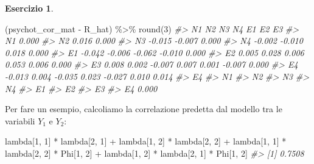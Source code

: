 \documentclass[
  11pt,
]{krantz}
\makeatletter
\newenvironment{Shaded}{\begin{snugshade}}{\end{snugshade}}
\newcommand{\CommentTok}[1]{\textcolor[rgb]{0.37,0.37,0.37}{\textit{#1}}}
\newcommand{\DecValTok}[1]{\textcolor[rgb]{0.06,0.06,0.06}{#1}}
\newcommand{\FunctionTok}[1]{\textcolor[rgb]{0,0,0}{#1}}
\newcommand{\NormalTok}[1]{#1}
\newcommand{\SpecialCharTok}[1]{\textcolor[rgb]{0,0,0}{#1}}
\newenvironment{kframe}{%
\medskip{}
\setlength{\fboxsep}{.8em}
 \def\at@end@of@kframe{}%
 \ifinner\ifhmode%
  \def\at@end@of@kframe{\end{minipage}}%
  \begin{minipage}{\columnwidth}%
 \fi\fi%
 \def\FrameCommand##1{\hskip\@totalleftmargin \hskip-\fboxsep
 \colorbox{shadecolor}{##1}\hskip-\fboxsep
     \hskip-\linewidth \hskip-\@totalleftmargin \hskip\columnwidth}%
 \MakeFramed {\advance\hsize-\width
   \@totalleftmargin\z@ \linewidth\hsize
   \@setminipage}}%
 {\par\unskip\endMakeFramed%
 \at@end@of@kframe}
\renewenvironment{Shaded}{\begin{kframe}}{\end{kframe}}
\theoremstyle{definition}
\theoremstyle{definition}
\theoremstyle{definition}
\newtheorem{exercise}{Esercizio}[chapter]
\theoremstyle{definition}
\theoremstyle{remark}
\makeatother
\begin{document}
\begin{exercise}
\begin{Shaded}
\begin{Highlighting}[]
\NormalTok{(psychot\_cor\_mat }\SpecialCharTok{{-}}\NormalTok{ R\_hat) }\SpecialCharTok{\%\textgreater{}\%}
  \FunctionTok{round}\NormalTok{(}\DecValTok{3}\NormalTok{)}
\CommentTok{\#\textgreater{}    N1     N2     N3     N4     E1     E2     E3    }
\CommentTok{\#\textgreater{} N1  0.000                                          }
\CommentTok{\#\textgreater{} N2  0.016  0.000                                   }
\CommentTok{\#\textgreater{} N3 {-}0.015 {-}0.007  0.000                            }
\CommentTok{\#\textgreater{} N4 {-}0.002 {-}0.010  0.018  0.000                     }
\CommentTok{\#\textgreater{} E1 {-}0.042 {-}0.006 {-}0.062 {-}0.010  0.000              }
\CommentTok{\#\textgreater{} E2  0.005  0.028  0.006  0.053  0.006  0.000       }
\CommentTok{\#\textgreater{} E3  0.008  0.002 {-}0.007  0.007  0.001 {-}0.007  0.000}
\CommentTok{\#\textgreater{} E4 {-}0.013  0.004 {-}0.035  0.023 {-}0.027  0.010  0.014}
\CommentTok{\#\textgreater{}    E4    }
\CommentTok{\#\textgreater{} N1       }
\CommentTok{\#\textgreater{} N2       }
\CommentTok{\#\textgreater{} N3       }
\CommentTok{\#\textgreater{} N4       }
\CommentTok{\#\textgreater{} E1       }
\CommentTok{\#\textgreater{} E2       }
\CommentTok{\#\textgreater{} E3       }
\CommentTok{\#\textgreater{} E4  0.000}
\end{Highlighting}
\end{Shaded}

Per fare un esempio, calcoliamo la correlazione predetta dal modello tra le variabili \(Y_1\) e \(Y_2\):

\begin{Shaded}
\begin{Highlighting}[]
\NormalTok{lambda[}\DecValTok{1}\NormalTok{, }\DecValTok{1}\NormalTok{] }\SpecialCharTok{*}\NormalTok{ lambda[}\DecValTok{2}\NormalTok{, }\DecValTok{1}\NormalTok{] }\SpecialCharTok{+}\NormalTok{ lambda[}\DecValTok{1}\NormalTok{, }\DecValTok{2}\NormalTok{] }\SpecialCharTok{*}\NormalTok{ lambda[}\DecValTok{2}\NormalTok{, }\DecValTok{2}\NormalTok{] }\SpecialCharTok{+}
\NormalTok{  lambda[}\DecValTok{1}\NormalTok{, }\DecValTok{1}\NormalTok{] }\SpecialCharTok{*}\NormalTok{ lambda[}\DecValTok{2}\NormalTok{, }\DecValTok{2}\NormalTok{] }\SpecialCharTok{*}\NormalTok{ Phi[}\DecValTok{1}\NormalTok{, }\DecValTok{2}\NormalTok{] }\SpecialCharTok{+}
\NormalTok{  lambda[}\DecValTok{1}\NormalTok{, }\DecValTok{2}\NormalTok{] }\SpecialCharTok{*}\NormalTok{ lambda[}\DecValTok{2}\NormalTok{, }\DecValTok{1}\NormalTok{] }\SpecialCharTok{*}\NormalTok{ Phi[}\DecValTok{1}\NormalTok{, }\DecValTok{2}\NormalTok{]}
\CommentTok{\#\textgreater{} [1] 0.7508}
\end{Highlighting}
\end{Shaded}


\end{exercise}
\end{document}

